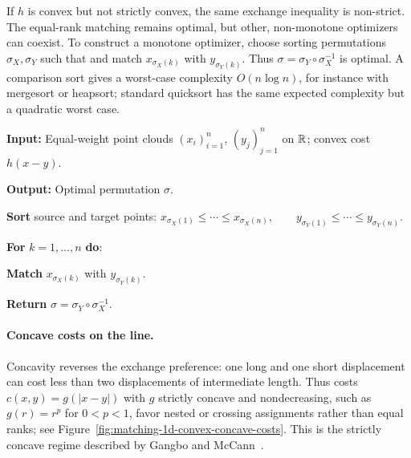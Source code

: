 If $h$ is convex but not strictly convex, the same exchange inequality is non-strict. The equal-rank matching remains optimal, but other, non-monotone optimizers can coexist. To construct a monotone optimizer, choose sorting permutations $\sigma_X,\sigma_Y$ such that
and match $x_{\sigma_X(k)}$ with $y_{\sigma_Y(k)}$. Thus $\sigma=\sigma_Y\circ\sigma_X^{-1}$ is optimal. A comparison sort gives a worst-case complexity $O(n\log n)$, for instance with mergesort or heapsort; standard quicksort has the same expected complexity but a quadratic worst case.

\begin{alg}\label{alg:one-dimensional-sorting}
\textbf{Input:} Equal-weight point clouds $(x_i)_{i=1}^n$, $(y_j)_{j=1}^n$ on $\mathbb{R}$; convex cost $h(x-y)$.

\textbf{Output:} Optimal permutation $\sigma$.

\textbf{Sort} source and target points:
\(x_{\sigma_X(1)}\leq\cdots\leq x_{\sigma_X(n)}, \qquad y_{\sigma_Y(1)}\leq\cdots\leq y_{\sigma_Y(n)}\).

\textbf{For} $k=1,\ldots,n$ \textbf{do}:
\begin{algblock}

\textbf{Match} $x_{\sigma_X(k)}$ with $y_{\sigma_Y(k)}$.

\end{algblock}
\algreturnskip
\textbf{Return} \(\sigma=\sigma_Y\circ\sigma_X^{-1}\).
\end{alg}

\paragraph{Concave costs on the line.}
Concavity reverses the exchange preference: one long and one short displacement can cost less than two displacements of intermediate length. Thus costs $c(x,y)=g(|x-y|)$ with $g$ strictly concave and nondecreasing, such as $g(r)=r^p$ for $0<p<1$, favor nested or crossing assignments rather than equal ranks; see Figure~\ref{fig:matching-1d-convex-concave-costs}. This is the strictly concave regime described by Gangbo and McCann~\cite{gangbo1996geometry}.

